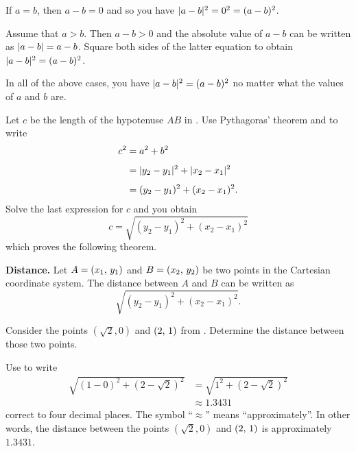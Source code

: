 \documentclass[a4paper,oneside,12pt]{article}
\begin{document}
{\begin{solution}
If $a = b$, then $a - b = 0$ and so you have
$\lvert a - b\rvert^2 = 0^2 = (a - b)^2$.

Assume that $a > b$.  Then $a - b > 0$ and the absolute value of
$a - b$ can be written as $\lvert a - b\rvert = a - b$.  Square
both sides of the latter equation to obtain
$\lvert a - b\rvert^2 = (a - b)^2$.

In all of the above cases, you have
$\lvert a - b\rvert^2 = (a - b)^2$ no matter what the values of
$a$ and $b$ are.
\end{solution}
}{}

Let $c$ be the length of the hypotenuse $AB$ in
.  Use Pythagoras' theorem and
 to write
\begin{align*}
c^2
&=
a^2 + b^2 \\[4pt]
&=
\lvert y_2 - y_1\rvert^2 + \lvert x_2 - x_1\rvert^2 \\[4pt]
&=
(y_2 - y_1)^2 + (x_2 - x_1)^2.
\end{align*}
Solve the last expression for $c$ and you obtain
\[
c
=
\sqrt{
  (y_2 - y_1)^2
  +
  (x_2 - x_1)^2
}
\]
which proves the following theorem.

\begin{theorem}
\label{thm:distance_between_two_points}
\textbf{Distance.}
Let $A = \left\lparen{x_1},\, {y_1}\right\rparen$ and $B = \left\lparen{x_2},\, {y_2}\right\rparen$ be two points in
the Cartesian coordinate system.  The distance between $A$ and $B$ can
be written as
\[
\sqrt{
  (y_2 - y_1)^2
  +
  (x_2 - x_1)^2
}.
\]
\end{theorem}

\begin{example}
Consider the points $(\sqrt{2}\comma 0)$ and $\left\lparen{2},\, {1}\right\rparen$ from
.  Determine the distance
between those two points.
\end{example}

\begin{solution}
Use  to write
\begin{align*}
\sqrt{
  (1 - 0)^2
  +
  (2 - \sqrt{2})^2
}
&=
\sqrt{
  1^2 + (2 - \sqrt{2})^2
} \\[4pt]
&\approx
1.3431
\end{align*}
correct to four decimal places.  The symbol ``$\approx$'' means
``approximately''.  In other words, the distance between the points
$(\sqrt{2}\comma 0)$ and $\left\lparen{2},\, {1}\right\rparen$ is approximately $1.3431$.
\end{solution}
\end{document}
